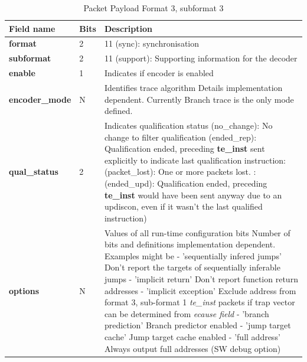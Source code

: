 \begin{table}[htp]
  \centering
  \caption{Packet Payload Format 3, subformat 3}
  \label{tab:te_inst3}
  \begin{tabulary}{\textwidth}{|l|p{35mm}|p{80mm}|}
    \hline
     {\bf Field name} & {\bf Bits} & {\bf Description} \\
     \hline
     \textbf{format} & 2 & 11 (sync): synchronisation\\
     \hline
     \textbf{subformat}  & 2 & 11 (support): Supporting information for the decoder \\
     \hline
     \textbf{enable} & 1 & Indicates if encoder is enabled\\
     \hline
     \textbf{encoder\_mode} & N & Identifies trace algorithm\newline
       Details implementation dependent.  Currently Branch trace is the only mode defined.\\
     \hline
     \textbf{qual\_status} & 2 & Indicates qualification status (no\_change): No change to filter qualification  (ended\_rep): Qualification ended, preceding \textbf{te\_inst} sent explicitly to indicate last qualification instruction: (packet\_lost): One or more packets lost. : (ended\_upd): Qualification ended, preceding \textbf{te\_inst} would have been sent anyway due to an updiscon, even if it wasn't the last qualified instruction)\\
     \hline
     \textbf{options} & N & Values of all run-time configuration bits\newline
       Number of bits and definitions implementation dependent.  Examples might be\newline
       - 'sequentially infered jumps' Don't report the targets of sequentially inferable jumps\newline
       - 'implicit return' Don't report function return addresses \newline
       - 'implicit exception' Exclude address from format 3, sub-format 1 \textit{te\_inst} packets if trap vector can be determined from \textit{ecause field}\newline
       - 'branch prediction' Branch predictor enabled\newline
       - 'jump target cache' Jump target cache enabled\newline
       - 'full address' Always output full addresses (SW debug option)\\
       \hline
  \end{tabulary}
\end{table}

